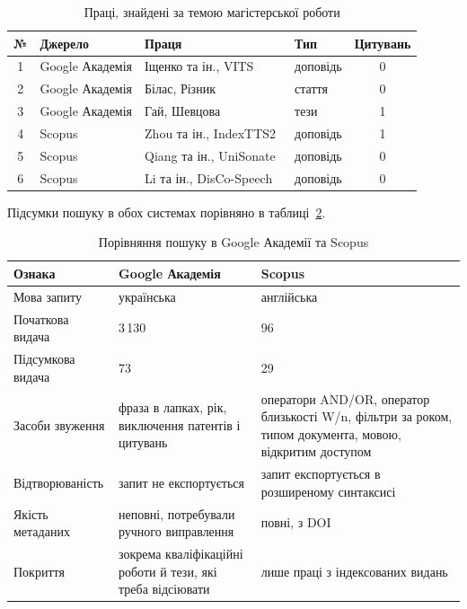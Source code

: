 \documentclass[14pt,a4paper]{extreport}
\begin{document}
\begin{table}[H]
\caption{Праці, знайдені за темою магістерської роботи}
\label{tab:results}
\small
\begin{tabularx}{\linewidth}{|c|l|X|l|c|}
\hline
\textbf{№} & \textbf{Джерело} & \textbf{Праця} & \textbf{Тип} & \textbf{Цитувань} \\
\hline
1 & Google Академія & Іщенко та ін., VITS~\cite{ishchenko2026} & доповідь & 0 \\
\hline
2 & Google Академія & Білас, Різник~\cite{bilas2026} & стаття & 0 \\
\hline
3 & Google Академія & Гай, Шевцова~\cite{gay2026} & тези & 1 \\
\hline
4 & Scopus & Zhou та ін., IndexTTS2~\cite{zhou2026} & доповідь & 1 \\
\hline
5 & Scopus & Qiang та ін., UniSonate~\cite{qiang2026} & доповідь & 0 \\
\hline
6 & Scopus & Li та ін., DisCo-Speech~\cite{li2026} & доповідь & 0 \\
\hline
\end{tabularx}
\end{table}

Підсумки пошуку в обох системах порівняно в таблиці~\ref{tab:compare}.

\begin{table}[H]
\caption{Порівняння пошуку в Google Академії та Scopus}
\label{tab:compare}
\small
\begin{tabularx}{\linewidth}{|l|X|X|}
\hline
\textbf{Ознака} & \textbf{Google Академія} & \textbf{Scopus} \\
\hline
Мова запиту & українська & англійська \\
\hline
Початкова видача & 3\,130 & 96 \\
\hline
Підсумкова видача & 73 & 29 \\
\hline
Засоби звуження & фраза в лапках, рік, виключення патентів і цитувань & оператори AND/OR, оператор близькості W/n, фільтри за роком, типом документа, мовою, відкритим доступом \\
\hline
Відтворюваність & запит не експортується & запит експортується в розширеному синтаксисі \\
\hline
Якість метаданих & неповні, потребували ручного виправлення & повні, з DOI \\
\hline
Покриття & зокрема кваліфікаційні роботи й тези, які треба відсіювати & лише праці з індексованих видань \\
\hline
\end{tabularx}
\end{table}
\end{document}
